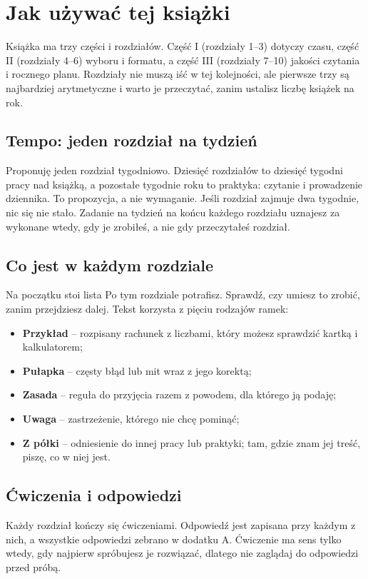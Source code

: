\chapter*{Jak używać tej książki}

Książka ma trzy części i  rozdziałów. Część I (rozdziały 1--3) dotyczy czasu,
część II (rozdziały 4--6) wyboru i formatu, a część III (rozdziały 7--10) jakości czytania
i rocznego planu. Rozdziały nie muszą iść w tej kolejności, ale pierwsze trzy są najbardziej
arytmetyczne i warto je przeczytać, zanim ustalisz liczbę książek na rok.

\section*{Tempo: jeden rozdział na tydzień}
Proponuję jeden rozdział tygodniowo. Dziesięć rozdziałów to dziesięć tygodni pracy nad książką,
a pozostałe tygodnie roku to praktyka: czytanie i prowadzenie dziennika. To propozycja, a nie
wymaganie. Jeśli rozdział zajmuje dwa tygodnie, nic się nie stało. Zadanie na tydzień na końcu
każdego rozdziału uznajesz za wykonane wtedy, gdy je zrobiłeś, a nie gdy przeczytałeś rozdział.

\section*{Co jest w każdym rozdziale}
Na początku stoi lista \glqq Po tym rozdziale potrafisz\grqq{}. Sprawdź, czy umiesz to zrobić,
zanim przejdziesz dalej. Tekst korzysta z pięciu rodzajów ramek:
\begin{itemize}
\item \textbf{Przykład} -- rozpisany rachunek z liczbami, który możesz sprawdzić kartką i kalkulatorem;
\item \textbf{Pułapka} -- częsty błąd lub mit wraz z jego korektą;
\item \textbf{Zasada} -- reguła do przyjęcia razem z powodem, dla którego ją podaję;
\item \textbf{Uwaga} -- zastrzeżenie, którego nie chcę pominąć;
\item \textbf{Z półki} -- odniesienie do innej pracy lub praktyki; tam, gdzie znam jej treść, piszę, co w niej jest.
\end{itemize}

\section*{Ćwiczenia i odpowiedzi}
Każdy rozdział kończy się ćwiczeniami. Odpowiedź jest zapisana przy każdym z nich, a wszystkie
odpowiedzi zebrano w dodatku A. Ćwiczenie ma sens tylko wtedy, gdy najpierw spróbujesz je
rozwiązać, dlatego nie zaglądaj do odpowiedzi przed próbą.

